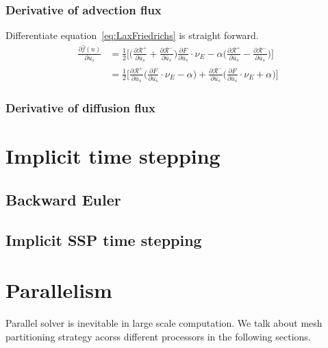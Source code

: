 \subsubsection{Derivative of advection flux}
Differentiate equation~\ref{eq:LaxFriedrichs} is straight forward.
\begin{equation}\label{eq:diffLaxFriedrichs}
		  \begin{aligned}
					 \frac{\partial \hat f(u)}{\partial \bar u_s} &= 
		  \frac{1}{2}
		  \Big[ \Big(\frac{\partial \mathscr{R}^+}{\partial \bar u_s} + \frac{\partial \mathscr{R}^-}{\partial \bar u_s}\Big)
		  \frac{\partial F}{\partial \bar u_s}\cdot \nu_E - \alpha 
		  \Big( \frac{\partial \mathscr{R}^+}{\partial \bar u_s}
			- \frac{\partial \mathscr{R}^-}{\partial \bar u_s}\Big)  \Big]\\
					 &=
					 \frac{1}{2} \Big[ 
					 \frac{\partial \mathscr{R}^+}{\partial \bar u_s}\Big( \frac{\partial F}{\partial \bar u_s}\cdot \nu_E 
					 - \alpha \Big) + 
\frac{\partial \mathscr{R}^-}{\partial \bar u_s}\Big( \frac{\partial F}{\partial \bar u_s}\cdot \nu_E 
					 + \alpha \Big) 
					 \Big]
		  \end{aligned}
\end{equation}

\subsubsection{Derivative of diffusion flux}



\section{Implicit time stepping}

\subsection{Backward Euler}

\subsection{Implicit SSP time stepping}

\section{Parallelism}
Parallel solver is inevitable in large scale computation.
We talk about mesh partitioning strategy 
acorss different processors in the following sections.
